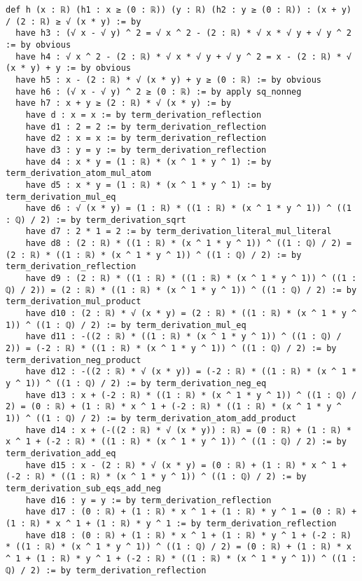 \documentclass{article}
\begin{document}
\begin{tcolorbox}[colback=white!10, width=\linewidth]
\begin{lstlisting}[language=Lean4]
def h (x : ℝ) (h1 : x ≥ (0 : ℝ)) (y : ℝ) (h2 : y ≥ (0 : ℝ)) : (x + y) / (2 : ℝ) ≥ √ (x * y) := by
  have h3 : (√ x - √ y) ^ 2 = √ x ^ 2 - (2 : ℝ) * √ x * √ y + √ y ^ 2 := by obvious
  have h4 : √ x ^ 2 - (2 : ℝ) * √ x * √ y + √ y ^ 2 = x - (2 : ℝ) * √ (x * y) + y := by obvious
  have h5 : x - (2 : ℝ) * √ (x * y) + y ≥ (0 : ℝ) := by obvious
  have h6 : (√ x - √ y) ^ 2 ≥ (0 : ℝ) := by apply sq_nonneg
  have h7 : x + y ≥ (2 : ℝ) * √ (x * y) := by
    have d : x = x := by term_derivation_reflection
    have d1 : 2 = 2 := by term_derivation_reflection
    have d2 : x = x := by term_derivation_reflection
    have d3 : y = y := by term_derivation_reflection
    have d4 : x * y = (1 : ℝ) * (x ^ 1 * y ^ 1) := by term_derivation_atom_mul_atom
    have d5 : x * y = (1 : ℝ) * (x ^ 1 * y ^ 1) := by term_derivation_mul_eq
    have d6 : √ (x * y) = (1 : ℝ) * ((1 : ℝ) * (x ^ 1 * y ^ 1)) ^ ((1 : ℚ) / 2) := by term_derivation_sqrt
    have d7 : 2 * 1 = 2 := by term_derivation_literal_mul_literal
    have d8 : (2 : ℝ) * ((1 : ℝ) * (x ^ 1 * y ^ 1)) ^ ((1 : ℚ) / 2) = (2 : ℝ) * ((1 : ℝ) * (x ^ 1 * y ^ 1)) ^ ((1 : ℚ) / 2) := by term_derivation_reflection
    have d9 : (2 : ℝ) * ((1 : ℝ) * ((1 : ℝ) * (x ^ 1 * y ^ 1)) ^ ((1 : ℚ) / 2)) = (2 : ℝ) * ((1 : ℝ) * (x ^ 1 * y ^ 1)) ^ ((1 : ℚ) / 2) := by term_derivation_mul_product
    have d10 : (2 : ℝ) * √ (x * y) = (2 : ℝ) * ((1 : ℝ) * (x ^ 1 * y ^ 1)) ^ ((1 : ℚ) / 2) := by term_derivation_mul_eq
    have d11 : -((2 : ℝ) * ((1 : ℝ) * (x ^ 1 * y ^ 1)) ^ ((1 : ℚ) / 2)) = (-2 : ℝ) * ((1 : ℝ) * (x ^ 1 * y ^ 1)) ^ ((1 : ℚ) / 2) := by term_derivation_neg_product
    have d12 : -((2 : ℝ) * √ (x * y)) = (-2 : ℝ) * ((1 : ℝ) * (x ^ 1 * y ^ 1)) ^ ((1 : ℚ) / 2) := by term_derivation_neg_eq
    have d13 : x + (-2 : ℝ) * ((1 : ℝ) * (x ^ 1 * y ^ 1)) ^ ((1 : ℚ) / 2) = (0 : ℝ) + (1 : ℝ) * x ^ 1 + (-2 : ℝ) * ((1 : ℝ) * (x ^ 1 * y ^ 1)) ^ ((1 : ℚ) / 2) := by term_derivation_atom_add_product
    have d14 : x + (-((2 : ℝ) * √ (x * y)) : ℝ) = (0 : ℝ) + (1 : ℝ) * x ^ 1 + (-2 : ℝ) * ((1 : ℝ) * (x ^ 1 * y ^ 1)) ^ ((1 : ℚ) / 2) := by term_derivation_add_eq
    have d15 : x - (2 : ℝ) * √ (x * y) = (0 : ℝ) + (1 : ℝ) * x ^ 1 + (-2 : ℝ) * ((1 : ℝ) * (x ^ 1 * y ^ 1)) ^ ((1 : ℚ) / 2) := by term_derivation_sub_eqs_add_neg
    have d16 : y = y := by term_derivation_reflection
    have d17 : (0 : ℝ) + (1 : ℝ) * x ^ 1 + (1 : ℝ) * y ^ 1 = (0 : ℝ) + (1 : ℝ) * x ^ 1 + (1 : ℝ) * y ^ 1 := by term_derivation_reflection
    have d18 : (0 : ℝ) + (1 : ℝ) * x ^ 1 + (1 : ℝ) * y ^ 1 + (-2 : ℝ) * ((1 : ℝ) * (x ^ 1 * y ^ 1)) ^ ((1 : ℚ) / 2) = (0 : ℝ) + (1 : ℝ) * x ^ 1 + (1 : ℝ) * y ^ 1 + (-2 : ℝ) * ((1 : ℝ) * (x ^ 1 * y ^ 1)) ^ ((1 : ℚ) / 2) := by term_derivation_reflection

\end{lstlisting}
\end{tcolorbox}
\end{document}
